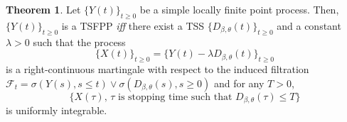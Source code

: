 \documentclass[11pt,oneside,reqno]{amsart}
\theoremstyle{definition}
\newtheorem{theorem}{\bf Theorem}[section]
\theoremstyle{remarkstyle}
\begin{document}
\begin{theorem}\label{Watanabe_characterization_TSFPP}
    Let $\{Y(t)\}_{t\ge 0}$ be a simple locally finite point process. Then, $\{Y(t)\}_{t\ge 0}$ is a TSFPP \textit{iff} there exist a TSS $\{D_{\beta,\theta}(t)\}_{t\ge 0}$ and a constant $\lambda>0$ such that the process 
    \begin{equation*}
    \{X(t)\}_{t\ge 0}=\{Y(t)-\lambda D_{\beta,\theta}(t)\}_{t\ge 0}    
    \end{equation*} 
    is a right-continuous martingale with respect to the induced filtration $\mathcal{F}_t=\sigma(Y(s),s\le t)\vee\sigma(D_{\beta,\theta}(s), s\ge 0)$ and for any $T>0$,
    \begin{equation}\label{stopping_times_martingale_TSFPP}
        \{X(\tau),\,\tau\,\, \text{is stopping time such that}\,\,D_{\beta,\theta}(\tau)\le T\}
    \end{equation}
    is uniformly integrable.
\end{theorem}
\end{document}
